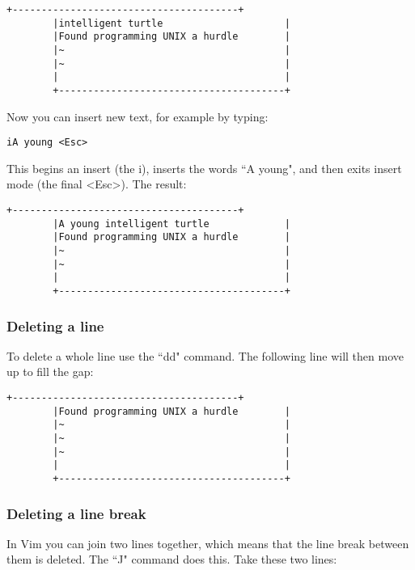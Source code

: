 		\begin{Verbatim}[samepage=true]
		+---------------------------------------+
		|intelligent turtle                     |
		|Found programming UNIX a hurdle        |
		|~                                      |
		|~                                      |
		|                                       |
		+---------------------------------------+
		\end{Verbatim}

Now you can insert new text, for example by typing:

 \begin{Verbatim}[samepage=true]
 iA young <Esc>
 \end{Verbatim}

This begins an insert (the i), inserts the words ``A young", and then exits insert mode (the final <Esc>).
 The result:
		\begin{Verbatim}[samepage=true]
		+---------------------------------------+
		|A young intelligent turtle             |
		|Found programming UNIX a hurdle        |
		|~                                      |
		|~                                      |
		|                                       |
		+---------------------------------------+
		\end{Verbatim}

\subsubsection{Deleting a line}

To delete a whole line use the ``dd" command.
The following line will then move up to fill the gap:

		\begin{Verbatim}[samepage=true]
		+---------------------------------------+
		|Found programming UNIX a hurdle        |
		|~                                      |
		|~                                      |
		|~                                      |
		|                                       |
		+---------------------------------------+
		\end{Verbatim}

\subsubsection{Deleting a line break}

In Vim you can join two lines together, which means that the line break between them is deleted.
The ``J" command does this.
Take these two lines:

